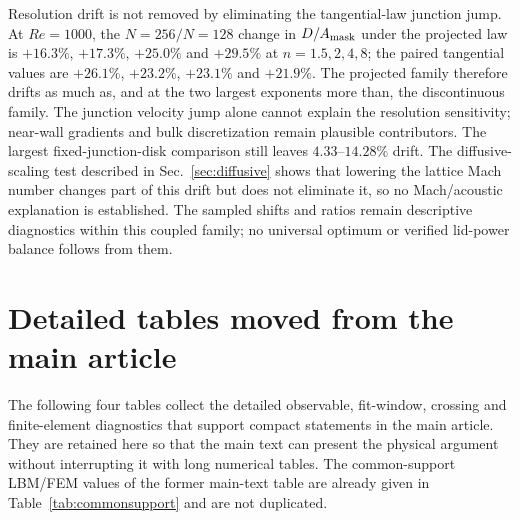 \documentclass[11pt]{article}
\newcommand{\tabbox}[1]{\resizebox{\ifdim\width>\textwidth\textwidth\else\width\fi}{!}{#1}}
\begin{document}
\color{revblue}Resolution drift is not removed by eliminating the tangential-law junction
\color{black}
\color{revblue}jump. At $Re=1000$, the $N=256/N=128$ change in $D/A_{\rm mask}$ under the
\color{black}
\color{revblue}projected law is $+16.3\%$, $+17.3\%$, $+25.0\%$ and $+29.5\%$ at
\color{black}
\color{revblue}$n=1.5,2,4,8$; the paired tangential values are $+26.1\%$, $+23.2\%$,
\color{black}
\color{revblue}$+23.1\%$ and $+21.9\%$. The projected family therefore drifts as much as, and
\color{black}
\color{revblue}at the two largest exponents more than, the discontinuous family. The junction
\color{black}
\color{revblue}velocity jump alone cannot explain the resolution sensitivity; near-wall
\color{black}
\color{revblue}gradients and bulk discretization remain plausible contributors. The largest
\color{black}
\color{revblue}fixed-junction-disk comparison still leaves $4.33$--$14.28\%$ drift. The
\color{black}
\color{revblue}diffusive-scaling test described in Sec.~\ref{sec:diffusive} shows that lowering
\color{black}
\color{revblue}the lattice Mach number changes part of this drift but does not eliminate it, so
\color{black}
\color{revblue}no Mach/acoustic explanation is established. The sampled shifts and
\color{black}
\color{revblue}ratios remain descriptive diagnostics within this coupled family; no universal
\color{black}
\color{revblue}optimum or verified lid-power balance follows from them.
\color{black}

\section{Detailed tables moved from the main article}
\label{sec:moved}
\color{revblue}The following four tables collect the detailed observable, fit-window,
\color{black}
\color{revblue}crossing and finite-element diagnostics that support compact statements in the
\color{black}
\color{revblue}main article. They are retained here so that the main text can present the
\color{black}
\color{revblue}physical argument without interrupting it with long numerical tables. The
\color{black}
\color{revblue}common-support LBM/FEM values of the former main-text table are already given
\color{black}
\color{revblue}in Table~\ref{tab:commonsupport} and are not duplicated.
\color{black}

\begin{table}[H]
\centering
\caption{Integrated kinetic energy at $Re=1000$, $N=128$, with the two area
normalizations kept distinct.}
\label{tab:kinetic_moved}
\tabbox{}
\end{table}
\par
\end{document}
